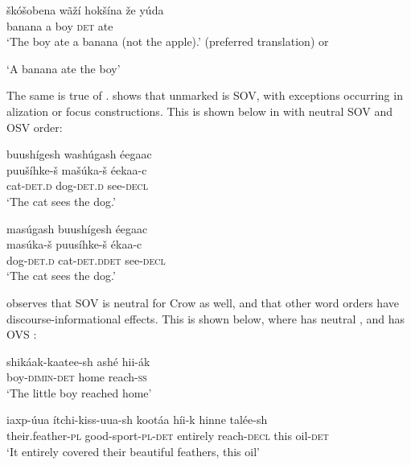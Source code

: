 \documentclass[output=paper]{LSP/langsci}
\begin{document}
\begin{exe}
\ex\label{ex:jrs:22}	\gll  \v{s}k\'o\v{s}obena w\~a\v{z}\'i 	hok\v{s}\'ina 	\v{z}e 		y\'uda \\
banana 		a 			boy 	\textsc{det} 	ate \\
\trans `The boy ate a banana (not the apple).' (preferred translation) or 

`A banana ate the boy'  \citep[49]{West2003} 
\end{exe}

The same is true of .  \citet{Boyle2007} shows that unmarked  is SOV, with exceptions occurring in alization or focus constructions.  This is shown below in  with neutral SOV  and  OSV order:

\begin{exe}
\ex\label{ex:jrs:23} 
\glll buush\'igesh wash\'ugash \'eegaac\\
puu\v{s}\'ihke-\v{s}  ma\v{s}\'uka-\v{s} \'eekaa-c \\
cat-\textsc{det.d} dog-\textsc{det.d} see-\textsc{decl}  \\
\trans `The cat sees the dog.'  \citep[214]{Boyle2007}

\ex\label{ex:jrs:24} 
\glll mas\'ugash 		buush\'igesh 	\'eegaac\\
mas\'uka-\v{s} 		puus\'ihke-\v{s} 	\'ekaa-c \\
dog-\textsc{det.d} 		cat-\textsc{det.d}\textsc{det}	see-\textsc{decl} \\
\trans `The cat sees the dog.' \citep[214]{Boyle2007}

\end{exe}
	
\citet{Graczyk1991a} observes that SOV is neutral  for Crow as well, and that other word orders have discourse-informational effects.  This is shown below, where  has neutral , and  has OVS :

\begin{exe}
\ex\label{ex:jrs:25} \gll shik\'aak-kaatee-sh ash\'e 		hii-\'ak \\
boy-\textsc{dimin-det} 		home 	reach-\textsc{ss} \\
\trans `The little boy reached home' \citep[101]{Graczyk1991a}

\ex\label{ex:jrs:26} \gll iaxp-\'uua 		\'itchi-kiss-uua-sh			koot\'aa 	h\'ii-k 	hinne		tal\'ee-sh \\
their.feather-\textsc{pl} good-sport-\textsc{pl}-\textsc{det}		entirely 	reach-\textsc{decl}	this 	oil-\textsc{det} \\
\trans `It entirely covered their beautiful feathers, this oil' \citep[103]{Graczyk1991a}
\end{exe}
\end{document}
